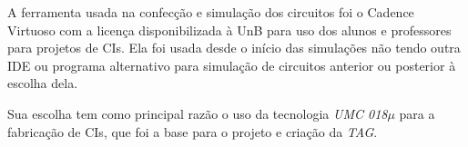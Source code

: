 A ferramenta usada na confecção e simulação dos circuitos foi o Cadence Virtuoso com a licença disponibilizada à UnB para uso dos alunos e professores para projetos de CIs. Ela foi usada desde o início das simulações não tendo outra IDE ou programa alternativo para simulação de circuitos anterior ou posterior à escolha dela.

Sua escolha tem como principal razão o uso da tecnologia \textit{UMC 018$\mu$} para a fabricação de CIs, que foi a base para o projeto e criação da \textit{TAG}. 




